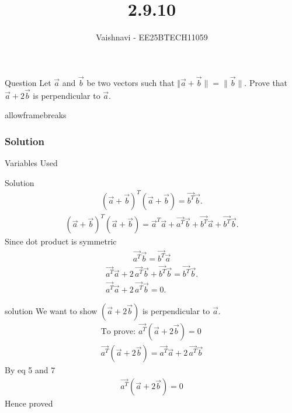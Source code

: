 \documentclass{beamer}
\title %
{2.9.10}
\author %
{Vaishnavi - EE25BTECH11059}
\begin{document}
\frame{\titlepage}
\begin{frame}{Question}
Let $\vec {a}$ and $\vec {b}$ be two vectors such that
$
\Vert \vec {a} + \vec {b}\rVert = \lVert \vec {b}\rVert.
$
Prove that $\vec {a} + 2\vec {b}$ is perpendicular to $\vec {a}$.
 

\end{frame}
\begin{frame}{allowframebreaks}
\frametitle{Solution}
\begin{table}[H]    
  \centering
  
  \caption{Variables Used}
  \label{tab:1.10.25}
\end{table}

\end{frame}


\begin{frame}{Solution}
\begin{align}
(\vec {a} + \vec {b})^T (\vec {a} + \vec {b}) = \vec {b^T} \vec {b}.
\end{align}
\begin{align}
(\vec {a} + \vec {b})^T(\vec {a} + \vec {b})
= \vec {a}^T \vec {a} + \vec {a^T} \vec {b} + \vec {b^T} \vec {a} + \vec {b^T} \vec {b}.
\end{align}
Since dot product is symmetric\\
\begin{align}
\vec {a^T} \vec {b} = \vec {b^T} \vec {a}
\end{align}
\begin{align}
\vec {a^T} \vec {a} + 2\,\vec {a^T} \vec {b} + \vec {b^T} \vec {b} = \vec {b^T} \vec {b}.\\
\vec {a^T} \vec {a} + 2\,\vec {a^T} \vec {b} = 0.
\end{align}

\end{frame}

\begin{frame}{solution}
We want to show $(\vec {a} + 2\vec {b})$ is perpendicular to $\vec {a}$.
\begin{align}
 \text{To prove: }\vec {a^T}(\vec {a} + 2\vec {b}) = 0\\
\vec {a^T}(\vec {a} + 2\vec {b}) = \vec {a^T} \vec {a} + 2\,\vec {a^T} \vec {b}
\end{align}
By eq 5 and 7
\begin{align}
\vec {a^T}(\vec {a} + 2\vec {b}) = 0
\end{align}
Hence proved 
\end{frame}
\end{document}
